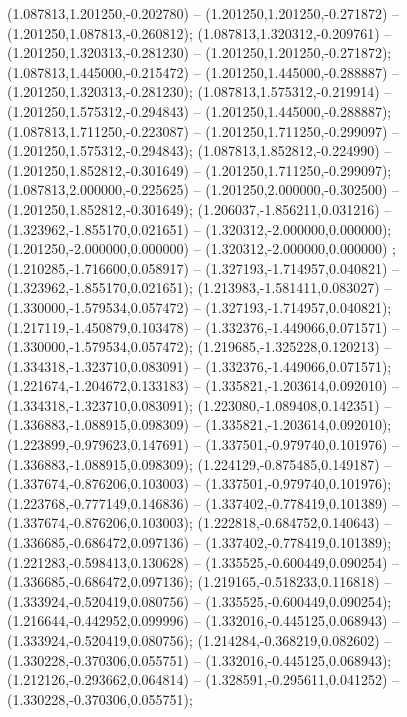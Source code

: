  (1.087813,1.201250,-0.202780) -- (1.201250,1.201250,-0.271872) -- (1.201250,1.087813,-0.260812);
 (1.087813,1.320312,-0.209761) -- (1.201250,1.320313,-0.281230) -- (1.201250,1.201250,-0.271872);
 (1.087813,1.445000,-0.215472) -- (1.201250,1.445000,-0.288887) -- (1.201250,1.320313,-0.281230);
 (1.087813,1.575312,-0.219914) -- (1.201250,1.575312,-0.294843) -- (1.201250,1.445000,-0.288887);
 (1.087813,1.711250,-0.223087) -- (1.201250,1.711250,-0.299097) -- (1.201250,1.575312,-0.294843);
 (1.087813,1.852812,-0.224990) -- (1.201250,1.852812,-0.301649) -- (1.201250,1.711250,-0.299097);
 (1.087813,2.000000,-0.225625) -- (1.201250,2.000000,-0.302500) -- (1.201250,1.852812,-0.301649);
 (1.206037,-1.856211,0.031216) -- (1.323962,-1.855170,0.021651) -- (1.320312,-2.000000,0.000000);
 (1.201250,-2.000000,0.000000) -- (1.320312,-2.000000,0.000000) ;
 (1.210285,-1.716600,0.058917) -- (1.327193,-1.714957,0.040821) -- (1.323962,-1.855170,0.021651);
 (1.213983,-1.581411,0.083027) -- (1.330000,-1.579534,0.057472) -- (1.327193,-1.714957,0.040821);
 (1.217119,-1.450879,0.103478) -- (1.332376,-1.449066,0.071571) -- (1.330000,-1.579534,0.057472);
 (1.219685,-1.325228,0.120213) -- (1.334318,-1.323710,0.083091) -- (1.332376,-1.449066,0.071571);
 (1.221674,-1.204672,0.133183) -- (1.335821,-1.203614,0.092010) -- (1.334318,-1.323710,0.083091);
 (1.223080,-1.089408,0.142351) -- (1.336883,-1.088915,0.098309) -- (1.335821,-1.203614,0.092010);
 (1.223899,-0.979623,0.147691) -- (1.337501,-0.979740,0.101976) -- (1.336883,-1.088915,0.098309);
 (1.224129,-0.875485,0.149187) -- (1.337674,-0.876206,0.103003) -- (1.337501,-0.979740,0.101976);
 (1.223768,-0.777149,0.146836) -- (1.337402,-0.778419,0.101389) -- (1.337674,-0.876206,0.103003);
 (1.222818,-0.684752,0.140643) -- (1.336685,-0.686472,0.097136) -- (1.337402,-0.778419,0.101389);
 (1.221283,-0.598413,0.130628) -- (1.335525,-0.600449,0.090254) -- (1.336685,-0.686472,0.097136);
 (1.219165,-0.518233,0.116818) -- (1.333924,-0.520419,0.080756) -- (1.335525,-0.600449,0.090254);
 (1.216644,-0.442952,0.099996) -- (1.332016,-0.445125,0.068943) -- (1.333924,-0.520419,0.080756);
 (1.214284,-0.368219,0.082602) -- (1.330228,-0.370306,0.055751) -- (1.332016,-0.445125,0.068943);
 (1.212126,-0.293662,0.064814) -- (1.328591,-0.295611,0.041252) -- (1.330228,-0.370306,0.055751);
